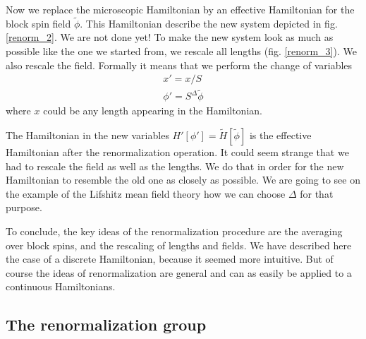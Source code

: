 Now we replace the microscopic Hamiltonian by an effective Hamiltonian for the block spin field $\tilde{\phi}$.
This Hamiltonian describe the new system depicted in fig. \eqref{renorm_2}. 
We are not done yet! To make the new system look as much as possible like the one we started from, we rescale all lengths (fig. \eqref{renorm_3}). We also rescale the field. Formally it means that we perform the change of variables
\begin{eqnarray}
x' = x/S  \\
\phi' = S^\Delta \tilde{\phi}
\end{eqnarray}
where $x$ could be any length appearing in the Hamiltonian.

The Hamiltonian in the new variables $H'[\phi'] = \tilde{H}[\tilde{\phi}]$ is the effective Hamiltonian after the renormalization operation.  
It could seem strange that we had to rescale the field as well as the lengths. We do that in order for the new Hamiltonian to resemble the old one as closely as possible. We are going to see on the example of the Lifshitz mean field theory how we can choose $\Delta$ for that purpose.

To conclude, the key ideas of the renormalization procedure are the averaging over block spins, and the rescaling of lengths and fields. We have described here the case of a discrete Hamiltonian, because it seemed more intuitive. But of course the ideas of renormalization are general and can as easily be applied to a continuous Hamiltonians.

\subsection{The renormalization group}

